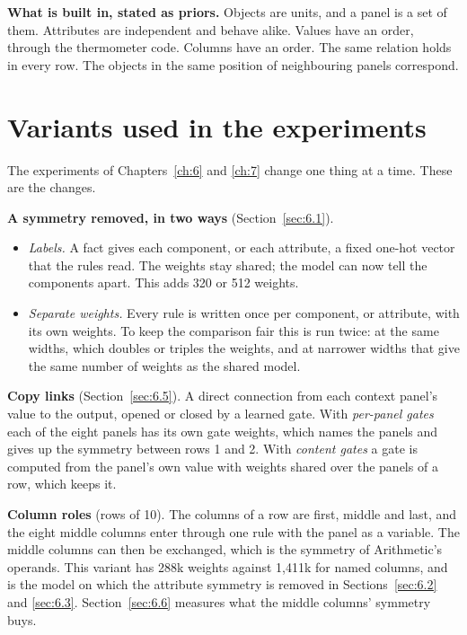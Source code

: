\textbf{What is built in, stated as priors.} Objects are units, and a panel is a set of them. Attributes are independent and behave alike. Values have an order, through the thermometer code. Columns have an order. The same relation holds in every row. The objects in the same position of neighbouring panels correspond.

\section{Variants used in the experiments}\label{sec:4.5}

The experiments of Chapters~\ref{ch:6} and \ref{ch:7} change one thing at a time. These are the changes.

\textbf{A symmetry removed, in two ways} (Section~\ref{sec:6.1}).

\begin{itemize}
\item \emph{Labels.} A fact gives each component, or each attribute, a fixed one-hot vector that the rules read. The weights stay shared; the model can now tell the components apart. This adds 320 or 512 weights.
\item \emph{Separate weights.} Every rule is written once per component, or attribute, with its own weights. To keep the comparison fair this is run twice: at the same widths, which doubles or triples the weights, and at narrower widths that give the same number of weights as the shared model.
\end{itemize}

\textbf{Copy links} (Section~\ref{sec:6.5}). A direct connection from each context panel's value to the output, opened or closed by a learned gate. With \emph{per-panel gates} each of the eight panels has its own gate weights, which names the panels and gives up the symmetry between rows 1 and 2. With \emph{content gates} a gate is computed from the panel's own value with weights shared over the panels of a row, which keeps it.

\textbf{Column roles} (rows of 10). The columns of a row are first, middle and last, and the eight middle columns enter through one rule with the panel as a variable. The middle columns can then be exchanged, which is the symmetry of Arithmetic's operands. This variant has 288k weights against 1,411k for named columns, and is the model on which the attribute symmetry is removed in Sections~\ref{sec:6.2} and \ref{sec:6.3}. Section~\ref{sec:6.6} measures what the middle columns' symmetry buys.

